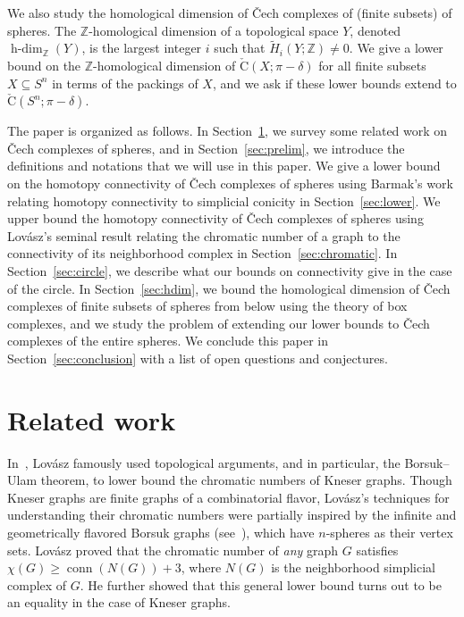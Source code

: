 \documentclass[11 pt,a4paper,twoside,reqno]{amsart}
\theoremstyle{definition}
\def\Z{{\mathbb Z}}
\newcommand{\cech}[2]{\mathrm{\check{C}}(#1;#2)}
\DeclareMathOperator{\conn}{conn}
\DeclareMathOperator{\hdim}{h-dim}
\begin{document}
We also study the homological dimension of \v{C}ech complexes of (finite subsets) of spheres.
The $\Z$-homological dimension of a topological space $Y$, denoted $\hdim_{\Z}(Y)$, is the largest integer $i$ such that $\widetilde{H}_i(Y; \Z) \neq 0$.
We give a lower bound on the $\Z$-homological dimension of $\cech{X}{\pi -\delta}$ for all finite subsets $X\subseteq S^n$ in terms of the packings of $X$, and we ask if these lower bounds extend to $\cech{S^n}{\pi -\delta}$.

The paper is organized as follows.
In Section~\ref{sec:related}, we survey some related work on \v{C}ech complexes of spheres, and in Section~\ref{sec:prelim}, we introduce the definitions and notations that we will use in this paper.
We give a lower bound on the homotopy connectivity of \v{C}ech complexes of spheres using Barmak's work relating homotopy connectivity to simplicial conicity in Section~\ref{sec:lower}.
We upper bound the homotopy connectivity of \v{C}ech complexes of spheres using Lov{\'a}sz's seminal result relating the chromatic number of a graph to the connectivity of its neighborhood complex in Section~\ref{sec:chromatic}.
In Section~\ref{sec:circle}, we describe what our bounds on connectivity give in the case of the circle.
In Section~\ref{sec:hdim}, we bound the homological dimension of \v{C}ech complexes of finite subsets of spheres from below using the theory of box complexes, and we study the problem of extending our lower bounds to \v{C}ech complexes of the entire spheres.
We conclude this paper in Section~\ref{sec:conclusion} with a list of open questions and conjectures.



\section{Related work}
\label{sec:related}

In~\cite{Lovasz1978}, Lov{\'a}sz famously used topological arguments, and in particular, the Borsuk--Ulam theorem, to lower bound the chromatic numbers of Kneser graphs.
Though Kneser graphs are finite graphs of a combinatorial flavor, Lov{\'a}sz's techniques for understanding their chromatic numbers were partially inspired by the infinite and geometrically flavored Borsuk graphs (see~\cite[Footnote~1]{Lovasz1978}), which have $n$-spheres as their vertex sets.
Lov{\'a}sz proved that the chromatic number of \emph{any} graph $G$ satisfies $\chi(G)\ge\conn(N(G))+3$, where $N(G)$ is the neighborhood simplicial complex of $G$.
He further showed that this general lower bound turns out to be an equality in the case of Kneser graphs.
\end{document}
